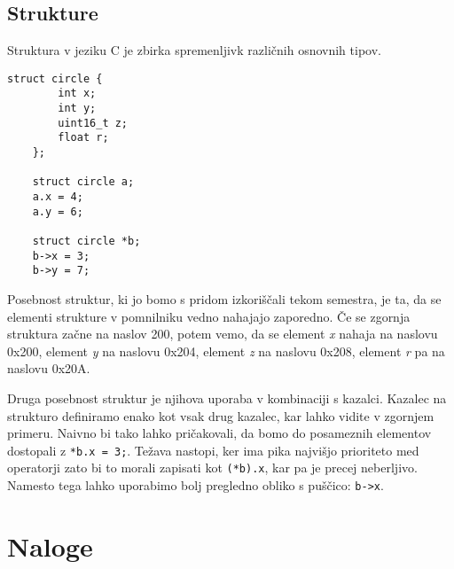 \documentclass[12pt,letterpaper]{article}
\begin{document}
\subsection*{Strukture}

Struktura v jeziku C je zbirka spremenljivk različnih osnovnih tipov. 

\begin{center}
\begin{lstlisting}[style=CStyle]
    struct circle {
        int x;
        int y;
        uint16_t z;
        float r;
    };
    
    struct circle a;
    a.x = 4;
    a.y = 6;
    
    struct circle *b;
    b->x = 3;
    b->y = 7;
\end{lstlisting}
\end{center}

Posebnost struktur, ki jo bomo s pridom izkoriščali tekom semestra, je ta, da se elementi strukture v pomnilniku vedno nahajajo zaporedno. Če se zgornja struktura začne na naslov 200, potem vemo, da se element \textit{x} nahaja na naslovu 0x200, element \textit{y} na naslovu 0x204, element \textit{z} na naslovu 0x208, element \textit{r} pa na naslovu 0x20A.

Druga posebnost struktur je njihova uporaba v kombinaciji s kazalci. Kazalec na strukturo definiramo enako kot vsak drug kazalec, kar lahko vidite v zgornjem primeru. Naivno bi tako lahko pričakovali, da bomo do posameznih elementov dostopali z \texttt{*b.x = 3;}. Težava nastopi, ker ima pika najvišjo prioriteto med operatorji zato bi to morali zapisati kot \texttt{(*b).x}, kar pa je precej neberljivo. Namesto tega lahko uporabimo bolj pregledno obliko s puščico: \texttt{b->x}.

\newpage

\section*{Naloge}
\end{document}
